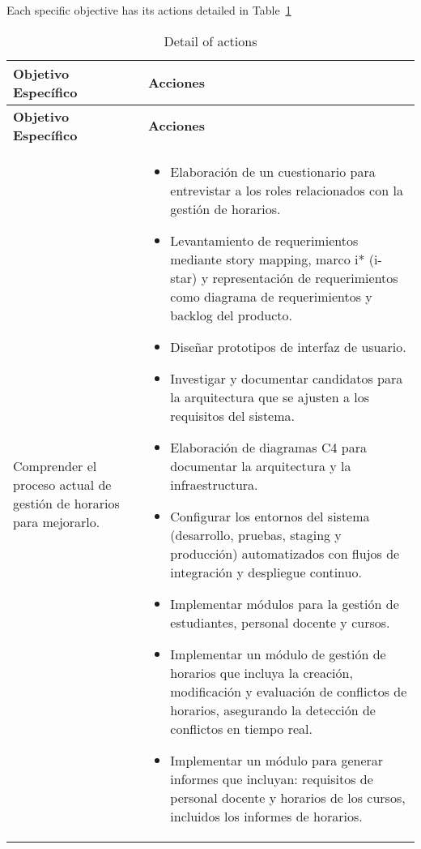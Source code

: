 Each specific objective has its actions detailed in Table~\ref{tab:actionsObjectives}
{\small
\begin{longtable}{>{\raggedright}p{2in}>{\raggedright\arraybackslash}p{4in}}
\caption{Detail of actions}
\label{tab:actionsObjectives} \\
\toprule
\textbf{Objetivo Específico} & \textbf{Acciones} \\
\midrule
\endfirsthead
\textbf{Objetivo Específico} & \textbf{Acciones} \\
\midrule
\endhead
\bottomrule
\endfoot
\hline
\endlastfoot

Comprender el proceso actual de gestión de horarios para mejorarlo. &
\begin{itemize}[nosep,leftmargin=1em,topsep=0pt]
\item Elaboración de un cuestionario para entrevistar a los roles relacionados con la gestión de horarios.
\item Levantamiento de requerimientos mediante story mapping, marco i* (i-star) y representación de requerimientos como diagrama de requerimientos y backlog del producto.
\item Diseñar prototipos de interfaz de usuario.
\item Investigar y documentar candidatos para la arquitectura que se ajusten a los requisitos del sistema.
\item Elaboración de diagramas C4 para documentar la arquitectura y la infraestructura.
\item Configurar los entornos del sistema (desarrollo, pruebas, staging y producción) automatizados con flujos de integración y despliegue continuo.
\item Implementar módulos para la gestión de estudiantes, personal docente y cursos.
\item Implementar un módulo de gestión de horarios que incluya la creación, modificación y evaluación de conflictos de horarios, asegurando la detección de conflictos en tiempo real.
\item Implementar un módulo para generar informes que incluyan: requisitos de personal docente y horarios de los cursos, incluidos los informes de horarios.
\end{itemize} \\


\end{longtable}}
